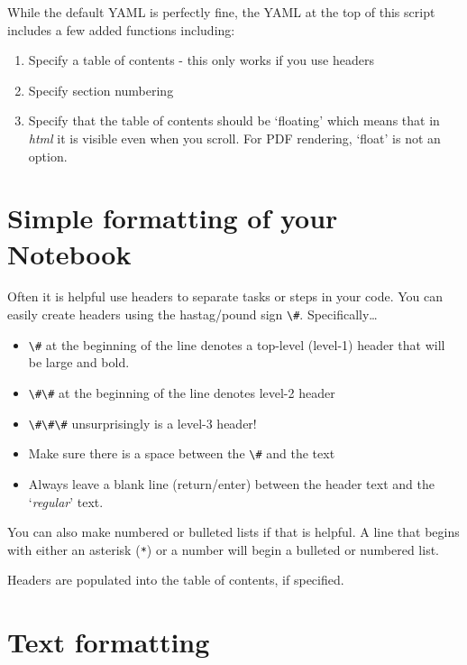 \documentclass[
]{book}
\newcommand{\passthrough}[1]{#1}
\providecommand{\tightlist}{%
  \setlength{\itemsep}{0pt}\setlength{\parskip}{0pt}}
\begin{document}
While the default YAML is perfectly fine, the YAML at the top of this script includes a few added functions including:

\begin{enumerate}
\def\labelenumi{\arabic{enumi}.}
\tightlist
\item
  Specify a table of contents - this only works if you use headers
\item
  Specify section numbering
\item
  Specify that the table of contents should be `floating' which means that in \emph{html} it is visible even when you scroll. For PDF rendering, `float' is not an option.
\end{enumerate}

\hypertarget{simple-formatting-of-your-notebook}{%
\section*{Simple formatting of your Notebook}\label{simple-formatting-of-your-notebook}}

Often it is helpful use headers to separate tasks or steps in your code. You can easily create headers using the hastag/pound sign \passthrough{\lstinline!\#!}. Specifically\ldots{}

\begin{itemize}
\tightlist
\item
  \passthrough{\lstinline!\#!} at the beginning of the line denotes a top-level (level-1) header that will be large and bold.
\item
  \passthrough{\lstinline!\#\#!} at the beginning of the line denotes level-2 header
\item
  \passthrough{\lstinline!\#\#\#!} unsurprisingly is a level-3 header!
\item
  Make sure there is a space between the \passthrough{\lstinline!\#!} and the text
\item
  Always leave a blank line (return/enter) between the header text and the `\emph{regular}' text.
\end{itemize}

You can also make numbered or bulleted lists if that is helpful. A line that begins with either an asterisk (\passthrough{\lstinline!*!}) or a number will begin a bulleted or numbered list.

Headers are populated into the table of contents, if specified.

\hypertarget{text-formatting}{%
\section*{Text formatting}\label{text-formatting}}
\end{document}
